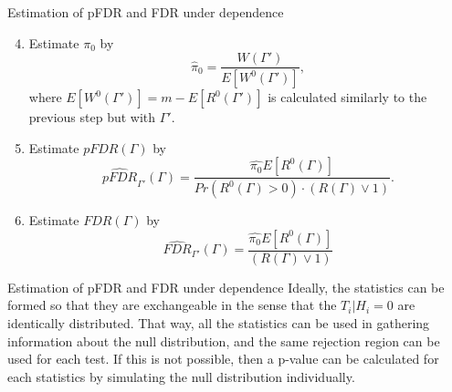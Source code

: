 \documentclass{beamer}
\begin{document}
\begin{frame}[t]{Estimation of pFDR and FDR under dependence}\vspace{10pt}

\begin{enumerate}
\setcounter{enumi}{3}	
	\item Estimate $\pi_0$ by 
	$$ \hat{\pi}_0 = \frac{W(\Gamma')}{E[W^0(\Gamma')]},$$
	where $E[W^0(\Gamma')] = m - E[R^0(\Gamma')]$ is calculated similarly to the previous step but with $\Gamma'$.
	\item Estimate $pFDR(\Gamma)$ by 
	$$ \hat{pFDR}_{\Gamma'}(\Gamma) = \frac{\hat{\pi_0}E[R^0(\Gamma)]}{Pr(R^0(\Gamma)>0)\cdot (R(\Gamma)\vee 1)}.$$
	\item Estimate $FDR(\Gamma)$ by 
	$$ \hat{FDR}_{\Gamma'}(\Gamma) = \frac{\hat{\pi_0}E[R^0(\Gamma)]}{ (R(\Gamma)\vee 1)}$$
\end{enumerate}
\end{frame}

\begin{frame}[t]{Estimation of pFDR and FDR under dependence}\vspace{10pt}
Ideally, the statistics can be formed so that they are exchangeable in the sense that the $T_i|H_i = 0$ are identically distributed. That way, all the statistics can be used in gathering information about the null distribution, and the same rejection region can be used for each test. If this is not possible, then a p-value can be calculated for each statistics by simulating the null distribution individually. 
\end{frame}
\end{document}
